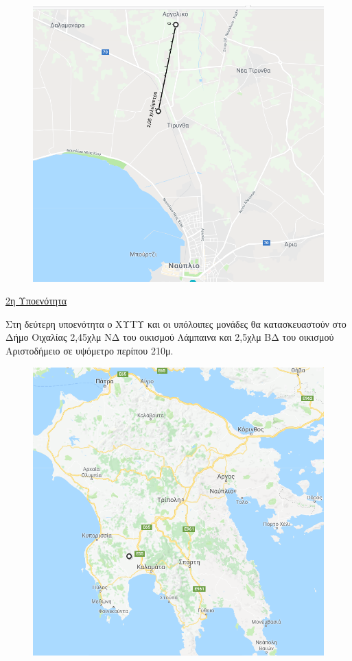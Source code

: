 \documentclass[12pt]{article}
\begin{document}
	\begin{figure} [H]
		\begin{center}
			\includegraphics [scale = 0.45] {map14.png}
		\end{center}
	\end{figure}

	\underline{2η Υποενότητα}
	
	Στη δεύτερη υποενότητα ο ΧΥΤΥ και οι υπόλοιπες μονάδες  θα κατασκευαστούν στο Δήμο Οιχαλίας 2,45χλμ ΝΔ του οικισμού Λάμπαινα και 2,5χλμ ΒΔ του οικισμού Αριστοδήμειο σε υψόμετρο περίπου 210μ.
	
	\begin{figure} [H]
		\begin{center}
			\includegraphics [scale = 0.55] {map15.png}
		\end{center}
	\end{figure}
\end{document}
